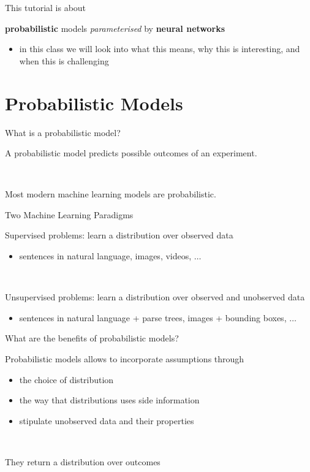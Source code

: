 \begin{frame}{This tutorial is about}

	{\bf probabilistic} models \emph{parameterised} by {\bf neural networks}
	\begin{itemize}
		\item in this class we will look into what this means, why this is interesting, and when this is challenging
	\end{itemize}
	
\end{frame}

\frame{\tableofcontents}

\section{Probabilistic Models}


\begin{frame}{What is a probabilistic model?}

	A probabilistic model predicts possible outcomes of an experiment. 
	
	~
	
	Most modern machine learning models are probabilistic.	

\end{frame}

\begin{frame}{Two Machine Learning Paradigms}

	Supervised problems: \alert{learn a distribution over observed data}
	\begin{itemize}
		\item sentences in natural language, images, videos, $\ldots$
	\end{itemize}
	
	~
	
	Unsupervised problems: \alert{learn a distribution over observed and unobserved data}
	\begin{itemize}
		\item sentences in natural language + parse trees, images + bounding boxes, $\ldots$
	\end{itemize}
\end{frame}

\begin{frame}{What are the benefits of probabilistic models?}

	Probabilistic models allows to incorporate assumptions through
	\begin{itemize}
		\item the choice of distribution
		\item the way that distributions uses side information
		\item stipulate unobserved data and their properties
	\end{itemize}
	
	~
	
	They return a distribution over outcomes	
	
\end{frame}

